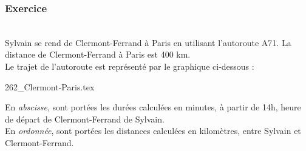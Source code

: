 \newpage

\subsubsection{Exercice } ~\\

 Sylvain se rend de Clermont-Ferrand à Paris en utilisant l'autoroute A71. La distance de Clermont-Ferrand à Paris est 400 km. \\

Le trajet de l'autoroute est représenté par le graphique ci-dessous : 

\bigskip 

\centerline{ {262_Clermont-Paris.tex}}

\newpage 

\vspace*{-2cm}

En {\it abscisse}, sont portées les durées calculées en minutes, à partir de 14h, heure de départ de Clermont-Ferrand de Sylvain. \\
En {\it ordonnée}, sont portées les distances calculées en kilomètres, entre Sylvain et Clermont-Ferrand. 

